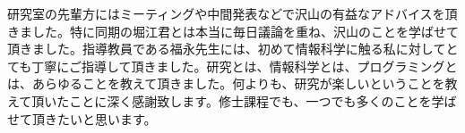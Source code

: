 \documentclass{jsarticle}
\begin{document}
研究室の先輩方にはミーティングや中間発表などで沢山の有益なアドバイスを頂きました。特に同期の堀江君とは本当に毎日議論を重ね、沢山のことを学ばせて頂きました。指導教員である福永先生には、初めて情報科学に触る私に対してとても丁寧にご指導して頂きました。研究とは、情報科学とは、プログラミングとは、あらゆることを教えて頂きました。何よりも、研究が楽しいということを教えて頂いたことに深く感謝致します。修士課程でも、一つでも多くのことを学ばせて頂きたいと思います。

\newpage




\newpage

\printindex
\end{document}
